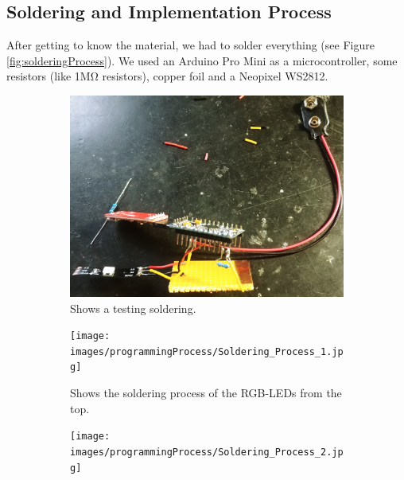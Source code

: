 \documentclass[04_projectProcess.tex]{subfiles}
\begin{document}
    \subsection{Soldering and Implementation Process}
    \begin{flushleft}
        After getting to know the material, we had to solder everything (see Figure \ref{fig:solderingProcess}).
        We used an Arduino Pro Mini \cite{arduinoProMini} as a microcontroller, some resistors (like 
        1M\si{\ohm} resistors), copper foil and a Neopixel WS2812. \\      
        
        \begin{figure}[H]
            \centering
            \begin{subfigure}{.45\textwidth}
                \centering
                \includegraphics[width=0.8\linewidth]{images/programmingProcess/solderingProcess.jpg}
                \caption{Shows a testing soldering.}
                \label{fig:solderingProcess_0}
                \vspace{6mm}
            \end{subfigure}
            \begin{subfigure}{.45\textwidth}
                \centering
                \texttt{[image: images/programmingProcess/Soldering\_Process\_1.jpg]}
                \caption{Shows the soldering process of the RGB-LEDs from the top.}
                \label{fig:solderingProcess_1}
                \vspace{6mm}
            \end{subfigure}
            \hspace{1mm}
            \begin{subfigure}{.45\textwidth}
                \centering
                \texttt{[image: images/programmingProcess/Soldering\_Process\_2.jpg]}

\end{subfigure}
\end{figure}
\end{flushleft}
\end{document}

